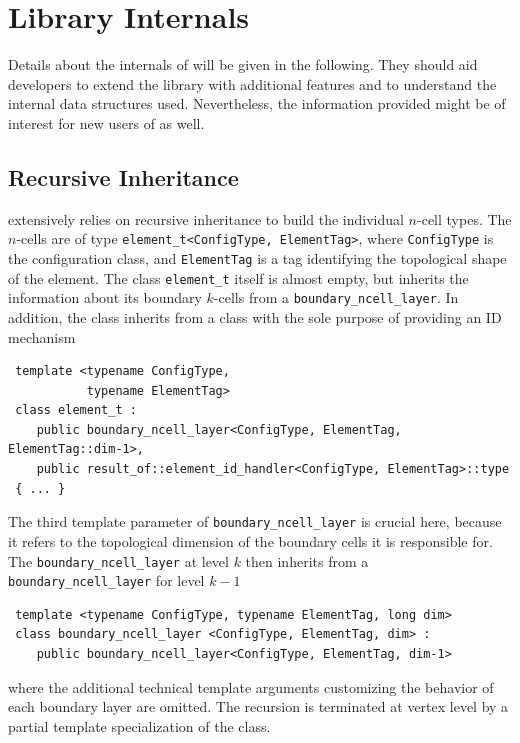 \chapter{Library Internals} \label{chap:internals}
Details about the internals of {\ViennaGrid} will be given in the following. 
They should aid developers to extend the library with additional features
and to understand the internal data structures used. 
Nevertheless, the information provided might be of interest for new users of {\ViennaGrid} as well.

\section{Recursive Inheritance}
{\ViennaGrid} extensively relies on recursive inheritance to build the individual $n$-cell types.
The $n$-cells are of type \lstinline|element_t<ConfigType, ElementTag>|, where \lstinline|ConfigType| is the configuration class,
and \lstinline|ElementTag| is a tag identifying the topological shape of the element. The class \lstinline|element_t| itself is almost empty, but
inherits the information about its boundary $k$-cells from a \lstinline|boundary_ncell_layer|. 
In addition, the class inherits from a class with the sole purpose of providing an ID mechanism
\begin{lstlisting}
 template <typename ConfigType,
           typename ElementTag>
 class element_t :
    public boundary_ncell_layer<ConfigType, ElementTag, ElementTag::dim-1>,
    public result_of::element_id_handler<ConfigType, ElementTag>::type
 { ... }
\end{lstlisting}
The third template parameter of \lstinline|boundary_ncell_layer| is crucial here,
because it refers to the topological dimension of the boundary cells it is responsible for.
The \lstinline|boundary_ncell_layer| at level $k$ then inherits from a \lstinline|boundary_ncell_layer| for level $k-1$
\begin{lstlisting}
 template <typename ConfigType, typename ElementTag, long dim>
 class boundary_ncell_layer <ConfigType, ElementTag, dim> :
    public boundary_ncell_layer<ConfigType, ElementTag, dim-1>
\end{lstlisting}
where the additional technical template arguments customizing the behavior of each boundary layer are omitted.
The recursion is terminated at vertex level by a partial template specialization of the class.

